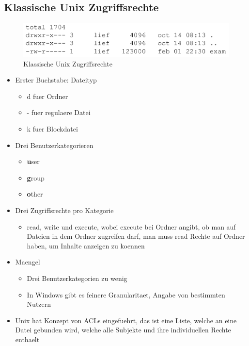\documentclass[a4paper]{scrreprt}
\begin{document}
\subsection{Klassische Unix Zugriffsrechte}

\begin{figure}[ht]
\centering
\includegraphics[scale=0.25]{graphics/unix_access_rights.png}
\caption{Klassische Unix Zugriffsrechte}
\end{figure}

\begin{itemize}
	\item Erster Buchstabe: Dateityp
		\begin{itemize}
			\item d fuer Ordner
			\item - fuer regulaere Datei
			\item k fuer Blockdatei
		\end{itemize}
	\item Drei Benutzerkategorieren
		\begin{itemize}
			\item \textbf{u}ser
			\item \textbf{g}roup
			\item \textbf{o}ther
		\end{itemize}
	\item Drei Zugriffsrechte pro Kategorie
		\begin{itemize}
			\item read, write und execute, wobei execute bei Ordner angibt, ob man auf Dateien in dem Ordner zugreifen darf, man muss read Rechte auf Ordner haben, um Inhalte anzeigen zu koennen
		\end{itemize}
	\item Maengel
		\begin{itemize}
			\item Drei Benutzerkategorien zu wenig
			\item In Windows gibt es feinere Granularitaet, Angabe von bestimmten Nutzern
		\end{itemize}
	\item Unix hat Konzept von ACLs eingefuehrt, das ist eine Liste, welche an eine Datei gebunden wird, welche alle Subjekte und ihre individuellen Rechte enthaelt
\end{itemize}
\end{document}
